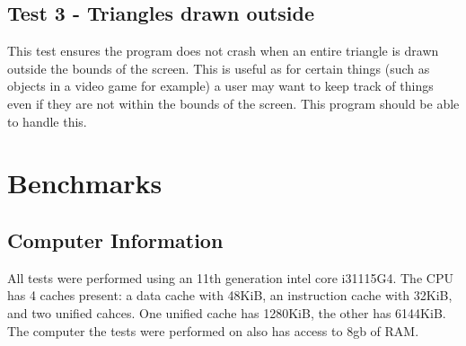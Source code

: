 \documentclass[
	letterpaper, %
	10pt, %
]{CSUniSchoolLabReport}
\begin{document}
\subsection*{Test 3 {-} Triangles drawn outside}
This test ensures the program does not crash when an entire triangle is drawn outside the bounds of 
the screen. This is useful as for certain things (such as objects in a video game for example) a user 
may want to keep track of things even if they are not within the bounds of the screen. This program 
should be able to handle this.

\section{Benchmarks}
\subsection{Computer Information}
\begin{flushleft}
	All tests were performed using an 11th generation intel core i3\-1115G4.
	The CPU has 4 caches present: a data cache with 48KiB, an instruction cache with 32KiB,
	and two unified cahces. One unified cache has 1280KiB, the other has 6144KiB.
	The computer the tests were performed on also has access to 8gb of RAM.
\end{flushleft}
\end{document}
